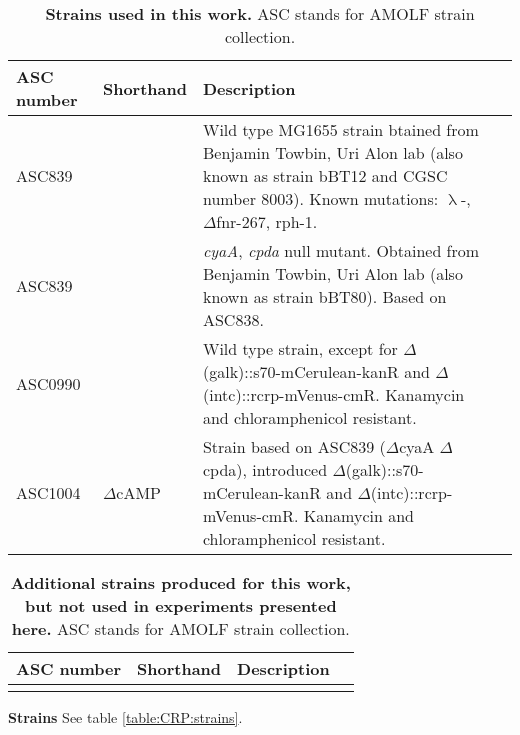\begin{table}[h]
	\begin{tabularx}{\textwidth}{llXl}

	\textbf{ASC number}	& \textbf{Shorthand} & \textbf{Description}	\\
	\hline

	ASC839	& 				& Wild type MG1655 strain btained from Benjamin Towbin, Uri Alon lab (also known as strain bBT12 and CGSC number 8003). Known mutations: $\uplambda$-, 	$\Delta$fnr-267, rph-1. \cite{Towbin2017} \\
	ASC839	& 				& \textit{cyaA}, \textit{cpda} null mutant. Obtained from Benjamin Towbin, Uri Alon lab (also known as strain bBT80). Based on ASC838. \cite{Towbin2017} \\
	
	
	ASC0990  &  			& Wild type strain, except for $\Delta$(galk)::s70-mCerulean-kanR and $\Delta$(intc)::rcrp-mVenus-cmR. Kanamycin and chloramphenicol resistant. \\
	ASC1004  & $\Delta$cAMP & Strain based on ASC839 ($\Delta$cyaA $\Delta$cpda), introduced $\Delta$(galk)::s70-mCerulean-kanR and $\Delta$(intc)::rcrp-mVenus-cmR. Kanamycin and chloramphenicol resistant. \\
	
	\hline
	\end{tabularx}
	\caption{\textbf{Strains used in this work.} ASC stands for AMOLF strain collection.}
\end{table}

\begin{table}[h]
	\begin{tabularx}{\textwidth}{llXl}
		
		\textbf{ASC number}	& \textbf{Shorthand} & \textbf{Description}	\\
		\hline
				
		\red{XXX} & 				\red{XXX} & 				\red{XXX} \\
				
		\hline
	\end{tabularx}
	\caption{\textbf{Additional strains produced for this work, but not used in experiments presented here.} ASC stands for AMOLF strain collection.}
\end{table}

\textbf{Strains} See table \ref{table:CRP:strains}.

